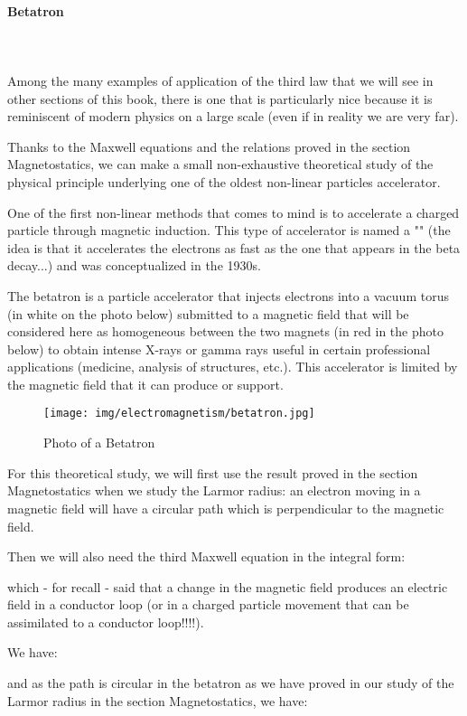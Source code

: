 	\paragraph{Betatron}\mbox{}\\\\
	Among the many examples of application of the third law that we will see in other sections of this book, there is one that is particularly nice because it is reminiscent of modern physics on a large scale (even if in reality we are very far).
	
	Thanks to the Maxwell equations and the relations proved in the section Magnetostatics, we can make a small non-exhaustive theoretical study of the physical principle underlying one of the oldest non-linear particles accelerator.
	
	One of the first non-linear methods that comes to mind is to accelerate a charged particle through magnetic induction. This type of accelerator is named a "" (the idea is that it accelerates the electrons as fast as the one that appears in the beta decay...) and was conceptualized in the 1930s.	
	
	The betatron is a particle accelerator that injects electrons into a vacuum torus (in white on the photo below) submitted to a magnetic field that will be considered here as homogeneous between the two magnets (in red in the photo below) to obtain intense X-rays or gamma rays useful in certain professional applications (medicine, analysis of structures, etc.). This accelerator is limited by the magnetic field that it can produce or support.
	\begin{figure}[H]
		\centering
		\texttt{[image: img/electromagnetism/betatron.jpg]}
		\caption{Photo of a Betatron}
	\end{figure}
	For this theoretical study, we will first use the result proved in the section Magnetostatics when we study the Larmor radius: an electron moving in a magnetic field will have a circular path which is perpendicular to the magnetic field.
	
	Then we will also need the third Maxwell equation in the integral form:
	
	which - for recall - said that a change in the magnetic field produces an electric field in a conductor loop (or in a charged particle movement that can be assimilated to a conductor loop!!!!).
	
	We have:
	
	and as the path is circular in the betatron as we have proved in our study of the Larmor radius in the section Magnetostatics, we have:
	
